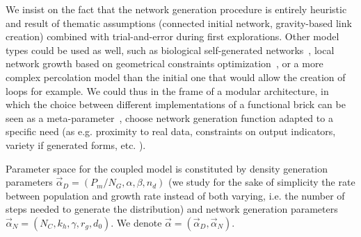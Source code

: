 \documentclass{bmcart}
\begin{document}
We insist on the fact that the network generation procedure is entirely heuristic and result of thematic assumptions (connected initial network, gravity-based link creation) combined with trial-and-error during first explorations. Other model types could be used as well, such as biological self-generated networks~\cite{tero2010rules}, local network growth based on geometrical constraints optimization~\cite{courtat2011mathematics}, or a more complex percolation model than the initial one that would allow the creation of loops for example. We could thus in the frame of a modular architecture, in which the choice between different implementations of a functional brick can be seen as a meta-parameter~\cite{cottineau2015growing}, choose network generation function adapted to a specific need (as e.g. proximity to real data, constraints on output indicators, variety if generated forms, etc. ).




Parameter space for the coupled model is constituted by density generation parameters $\vec{\alpha}_D = (P_m/N_G , \alpha,\beta , n_d)$ (we study for the sake of simplicity the rate between population and growth rate instead of both varying, i.e. the number of steps needed to generate the distribution) and network generation parameters $\vec{\alpha}_N=(N_C,k_h,\gamma , r_g , d_0)$. We denote $\vec{\alpha} = (\vec{\alpha}_D,\vec{\alpha}_N)$. 



\end{document}
